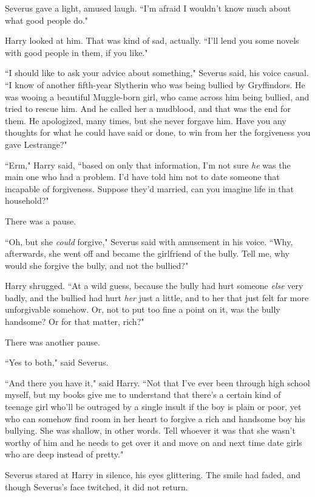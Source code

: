 Severus gave a light, amused laugh. ``I'm afraid I wouldn't know much about what good people do."

Harry looked at him. That was kind of sad, actually. ``I'll lend you some novels with good people in them, if you like."

``I should like to ask your advice about something," Severus said, his voice casual. ``I know of another fifth-year Slytherin who was being bullied by Gryffindors. He was wooing a beautiful Muggle-born girl, who came across him being bullied, and tried to rescue him. And he called her a mudblood, and that was the end for them. He apologized, many times, but she never forgave him. Have you any thoughts for what he could have said or done, to win from her the forgiveness you gave Lestrange?"

``Erm," Harry said, ``based on only that information, I'm not sure \emph{he} was the main one who had a problem. I'd have told him not to date someone that incapable of forgiveness. Suppose they'd married, can you imagine life in that household?"

There was a pause.

``Oh, but she \emph{could} forgive," Severus said with amusement in his voice. ``Why, afterwards, she went off and became the girlfriend of the bully. Tell me, why would she forgive the bully, and not the bullied?"

Harry shrugged. ``At a wild guess, because the bully had hurt someone \emph{else} very badly, and the bullied had hurt \emph{her} just a little, and to her that just felt far more unforgivable somehow. Or, not to put too fine a point on it, was the bully handsome? Or for that matter, rich?"

There was another pause.

``Yes to both," said Severus.

``And there you have it," said Harry. ``Not that I've ever been through high school myself, but my books give me to understand that there's a certain kind of teenage girl who'll be outraged by a single insult if the boy is plain or poor, yet who can somehow find room in her heart to forgive a rich and handsome boy his bullying. She was shallow, in other words. Tell whoever it was that she wasn't worthy of him and he needs to get over it and move on and next time date girls who are deep instead of pretty."

Severus stared at Harry in silence, his eyes glittering. The smile had faded, and though Severus's face twitched, it did not return.

